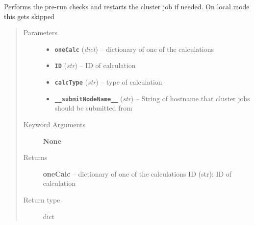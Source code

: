 \documentclass[letterpaper,10pt,english]{sphinxmanual}
\begin{document}

\begin{fulllineitems}
\label{run:run.__qe__pre_run}
Performs the pre-run checks and restarts the cluster job if needed.
On local mode this gets skipped
\begin{quote}\begin{description}
\item[{Parameters}] \leavevmode\begin{itemize}
\item {} 
\textbf{\texttt{oneCalc}} (\emph{dict}) -- dictionary of one of the calculations

\item {} 
\textbf{\texttt{ID}} (\emph{str}) -- ID of calculation

\item {} 
\textbf{\texttt{calcType}} (\emph{str}) -- type of calculation

\item {} 
\textbf{\texttt{\_\_submitNodeName\_\_}} (\emph{str}) -- String of hostname that cluster jobs should be submitted from

\end{itemize}

\item[{Keyword Arguments}] \leavevmode
\textbf{None}

\item[{Returns}] \leavevmode
\textbf{oneCalc} --
dictionary of one of the calculations
ID (str): ID of calculation

\item[{Return type}] \leavevmode
dict

\end{description}\end{quote}

\end{fulllineitems}

\end{document}
